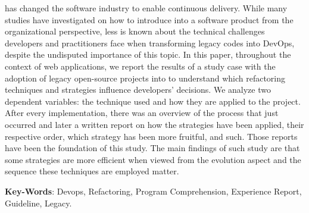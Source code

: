 \begin{resumo}

  \devops has changed the software industry to enable continuous delivery. While
  many studies have investigated on how to introduce \devops into a software
  product from the organizational perspective, less is known about the technical
  challenges developers and practitioners face when transforming legacy codes
  into DevOps, despite the undisputed importance of this topic. In this paper,
  throughout the context of web applications, we report the results of a study
  case with the adoption of \numberofprojects legacy open-source projects into
  \devops to understand which refactoring techniques and strategies influence
  developers' decisions. We analyze two dependent variables: the technique used
  and how they are applied to the project. After every implementation, there was
  an overview of the process that just occurred and later a written report on
  how the strategies have been applied, their respective order, which strategy
  has been more fruitful, and such. Those reports have been the foundation of
  this study. The main findings of such study are that some strategies are more
  efficient when viewed from the evolution aspect and the sequence these
  techniques are employed matter.

 \vspace{\onelineskip}
    
 \noindent
 \textbf{Key-Words}: Devops, Refactoring, Program Comprehension, Experience Report, Guideline, Legacy.
\end{resumo}
